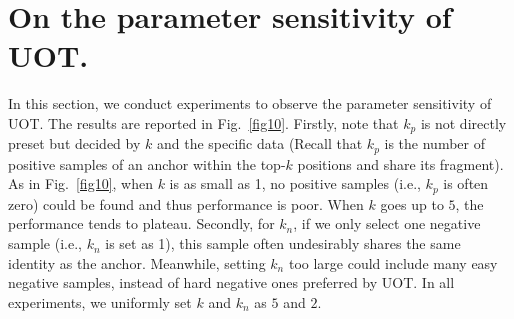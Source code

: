 \documentclass[10pt,twocolumn,letterpaper]{article}
\begin{document}
\section{On the parameter sensitivity of UOT.}
In this section, we conduct experiments to observe the parameter sensitivity of UOT. The results are reported in Fig.~\ref{fig10}. Firstly, note that $k_p$ is not directly preset but decided by $k$ and the specific data (Recall that $k_p$ is the number of positive samples of an anchor within the top-$k$ positions and share its fragment). As in Fig.~\ref{fig10}, when $k$ is as small as 1, no positive samples (i.e., $k_p$ is often zero) could be found and thus performance is poor. When $k$ goes up to $5$, the performance tends to plateau. Secondly, for $k_n$, if we only select one negative sample (i.e., $k_n$ is set as 1), this sample often undesirably shares the same identity as the anchor. Meanwhile, setting $k_n$ too large could include many easy negative samples, instead of hard negative ones preferred by UOT. In all experiments, we uniformly set $k$ and $k_n$ as $5$ and $2$.
\end{document}

